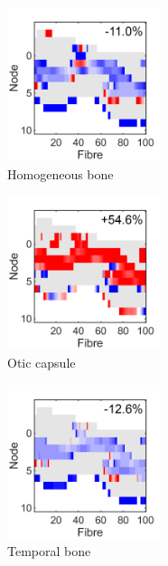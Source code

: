 \begin{figure}
	\centering
	\hfill%
	\begin{subfigure}[t]{0.3\textwidth}
        \centering
        \includegraphics[height=4.5cm]{Validation/delta_af-TR-bone}
        \caption{Homogeneous bone}
        \label{fig:valid_delta_af_bone}
    \end{subfigure}%
	\begin{subfigure}[t]{0.3\textwidth}
        \centering
        \includegraphics[height=4.5cm]{Validation/delta_af-TR-otic}
        \caption{Otic capsule}
        \label{fig:valid_delta_af_otic}
    \end{subfigure}%
	\begin{subfigure}[t]{0.3\textwidth}
        \centering
        \includegraphics[height=4.5cm]{Validation/delta_af-TR-tempbone}
        \caption{Temporal bone}
        \label{fig:valid_delta_af_tempbone}
    \end{subfigure}%
    \begin{subfigure}[t]{0.09\textwidth}
        \centering
        \phantom{\hspace{1.4cm}}
    \end{subfigure}\\%

\end{figure}
